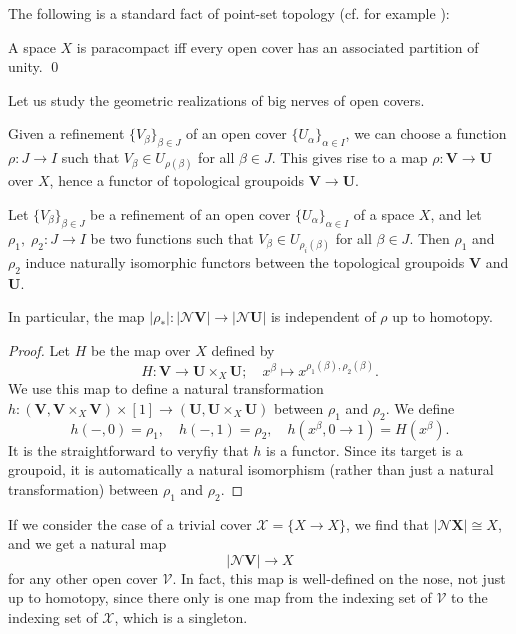 \documentclass[a4paper,openany]{scrbook}
\newcommand{\nerve}{\mathcal N}
\begin{document}
The following is a standard fact of point-set topology (cf. for example \cite[Chapter I.12]{bredon:topology-geometry}):

\begin{prop}
A space $X$ is paracompact iff every open cover has an associated partition of unity. \qed
\end{prop}

Let us study the geometric realizations of big nerves of open covers. 

Given a refinement $\{V_\beta\}_{\beta \in J}$ of an open cover $\{U_\alpha\}_{\alpha \in I}$, we can choose a function $\rho\colon J \to I$ such that $V_\beta \in U_{\rho(\beta)}$ for all $\beta \in J$. This gives rise to a map $\rho\colon \mathbf V \to \mathbf U$ over $X$, hence a functor of topological groupoids $\mathbf V \to \mathbf U$.

\begin{prop} \label{prop:refinementhomotopyinvariant}
Let $\{V_\beta\}_{\beta \in J}$ be a refinement of an open cover $\{U_\alpha\}_{\alpha \in I}$ of a space $X$, and let $\rho_1,\;\rho_2\colon J \to I$ be two functions such that $V_\beta \in U_{\rho_i(\beta)}$ for all $\beta \in J$. Then $\rho_1$ and $\rho_2$ induce naturally isomorphic functors between the topological groupoids $\mathbf V$ and $\mathbf U$.

In particular, the map $|\rho_*|\colon |\nerve\mathbf V| \to |\nerve \mathbf U|$ is independent of $\rho$ up to homotopy.
\end{prop}
\begin{proof}
Let $H$ be the map over $X$ defined by
\[
H\colon \mathbf V \to \mathbf U \times_X \mathbf U; \quad x^\beta \mapsto x^{\rho_1(\beta),\rho_2(\beta)}.
\]
We use this map to define a natural transformation $h\colon (\mathbf V,\mathbf V \times_X \mathbf V) \times [1] \to (\mathbf U,\mathbf U \times_X \mathbf U)$ between $\rho_1$ and $\rho_2$. We define
\[
h(-,0) = \rho_1, \quad h(-,1) = \rho_2, \quad h(x^\beta,0 \to 1) = H(x^\beta).
\]
It is the straightforward to veryfiy that $h$ is a functor. Since its target is a groupoid, it is automatically a natural isomorphism (rather than just a natural transformation) between $\rho_1$ and $\rho_2$.
\end{proof}

If we consider the case of a trivial cover $\mathcal X = \{X \to X\}$, we find that $|\nerve \mathbf X| \cong X$, and we get a natural map
\[
|\nerve\mathbf V| \to X
\]
for any other open cover $\mathcal V$. In fact, this map is well-defined on the nose, not just up to homotopy, since there only is one map from the indexing set of $\mathcal V$ to the indexing set of $\mathcal X$, which is a singleton.
\end{document}
